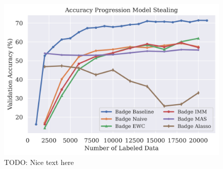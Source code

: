 \begin{figure}[h]
    \centering
    \includegraphics[width=0.8\linewidth]{images/results_CALMS/cifar_softmax_badge.png}
    \caption[Accuracy Comparison for Model Stealing on MNIST using the softmax output and the Active Learning strategy Badge]{TODO: Nice text here}
    \label{fig:CALMSMNISTSoftmaxBadge}
\end{figure}